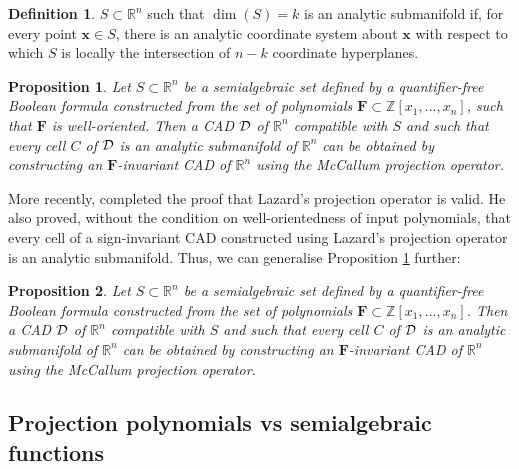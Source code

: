 \documentclass[
]{book}
\newtheorem{proposition}{Proposition}[chapter]
\theoremstyle{definition}
\newtheorem{definition}{Definition}[chapter]
\theoremstyle{definition}
\theoremstyle{definition}
\theoremstyle{definition}
\theoremstyle{remark}
\begin{document}
\begin{definition}
\protect\hypertarget{def:analytic-submanifold}{}\label{def:analytic-submanifold}\(S \subset \mathbb{R}^n\) such that \(\dim(S) = k\) is an analytic submanifold if, for every point \(\mathbf{x} \in S\), there is an analytic coordinate system about \(\mathbf{x}\) with respect to which \(S\) is locally the intersection of \(n-k\) coordinate hyperplanes.
\end{definition}

\begin{proposition}
\protect\hypertarget{prp:mc-smooth}{}\label{prp:mc-smooth}Let \(S \subset \mathbb{R}^n\) be a semialgebraic set defined by a quantifier-free Boolean formula constructed from the set of polynomials \(\mathbf{F} \subset \mathbb{Z}[x_1,\ldots,x_n]\), such that \(\mathbf{F}\) is well-oriented.
Then a CAD \(\cal D\) of \(\mathbb{R}^n\) compatible with \(S\) and such that every cell \(C\) of \(\cal D\) is an analytic submanifold of \(\mathbb{R}^n\) can be obtained by constructing an \(\mathbf{F}\)-invariant CAD of \(\mathbb{R}^n\) using the McCallum projection operator.
\end{proposition}

More recently, \citet{mccallum2019} completed the proof that Lazard's projection operator is valid. He also proved, without the condition on well-orientedness of input polynomials, that every cell of a sign-invariant CAD constructed using Lazard's projection operator is an analytic submanifold. Thus, we can generalise Proposition \ref{prp:mc-smooth} further:

\begin{proposition}
\protect\hypertarget{prp:lz-smooth}{}\label{prp:lz-smooth}Let \(S \subset \mathbb{R}^n\) be a semialgebraic set defined by a quantifier-free Boolean formula constructed from the set of polynomials \(\mathbf{F} \subset \mathbb{Z}[x_1,\ldots,x_n]\).
Then a CAD \(\cal D\) of \(\mathbb{R}^n\) compatible with \(S\) and such that every cell \(C\) of \(\cal D\) is an analytic submanifold of \(\mathbb{R}^n\) can be obtained by constructing an \(\mathbf{F}\)-invariant CAD of \(\mathbb{R}^n\) using the McCallum projection operator.
\end{proposition}

\hypertarget{projection-polynomials-vs-semialgebraic-functions}{%
\subsection{Projection polynomials vs semialgebraic functions}\label{projection-polynomials-vs-semialgebraic-functions}}
\end{document}
